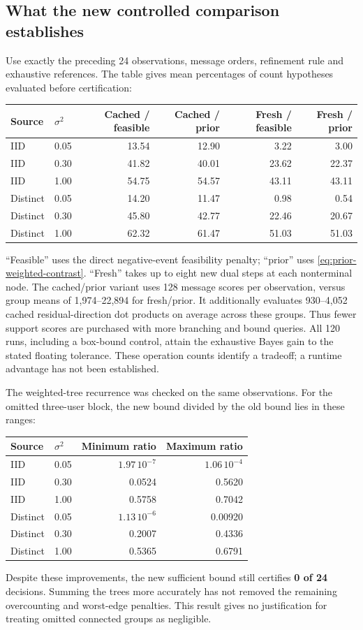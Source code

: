 \documentclass[10pt,a4paper]{article}
\begin{document}
\subsection{What the new controlled comparison establishes}
Use exactly the preceding 24 observations, message orders, refinement rule and exhaustive references.
The table gives mean percentages of count hypotheses evaluated before certification:
\begin{center}
\begin{tabular}{@{}llrrrr@{}}\toprule
Source & $\sigma^2$ & Cached / feasible & Cached / prior & Fresh / feasible & Fresh / prior\\\midrule
IID & 0.05 & 13.54 & 12.90 & 3.22 & 3.00\\
IID & 0.30 & 41.82 & 40.01 & 23.62 & 22.37\\
IID & 1.00 & 54.75 & 54.57 & 43.11 & 43.11\\
Distinct & 0.05 & 14.20 & 11.47 & 0.98 & 0.54\\
Distinct & 0.30 & 45.80 & 42.77 & 22.46 & 20.67\\
Distinct & 1.00 & 62.32 & 61.47 & 51.03 & 51.03\\\bottomrule
\end{tabular}
\end{center}
``Feasible'' uses the direct negative-event feasibility penalty; ``prior'' uses
\eqref{eq:prior-weighted-contrast}. ``Fresh'' takes up to eight new dual steps at each nonterminal node.
The cached/prior variant uses 128 message scores per observation, versus group means of
1,974--22,894 for fresh/prior. It additionally evaluates 930--4,052 cached residual-direction dot products
on average across these groups. Thus fewer support scores are purchased with more branching and bound queries.
All 120 runs, including a box-bound control, attain the exhaustive Bayes gain to the stated floating tolerance.
These operation counts identify a tradeoff; a runtime advantage has not been established.

The weighted-tree recurrence was checked on the same observations. For the omitted three-user block,
the new bound divided by the old bound lies in these ranges:
\begin{center}
\begin{tabular}{@{}llrr@{}}\toprule
Source & $\sigma^2$ & Minimum ratio & Maximum ratio\\\midrule
IID & 0.05 & $1.97\,10^{-7}$ & $1.06\,10^{-4}$\\
IID & 0.30 & 0.0524 & 0.5620\\
IID & 1.00 & 0.5758 & 0.7042\\
Distinct & 0.05 & $1.13\,10^{-6}$ & 0.00920\\
Distinct & 0.30 & 0.2007 & 0.4336\\
Distinct & 1.00 & 0.5365 & 0.6791\\\bottomrule
\end{tabular}
\end{center}
Despite these improvements, the new sufficient bound still certifies \textbf{0 of 24} decisions.
Summing the trees more accurately has not removed the remaining overcounting and worst-edge penalties.
This result gives no justification for treating omitted connected groups as negligible.
\end{document}
